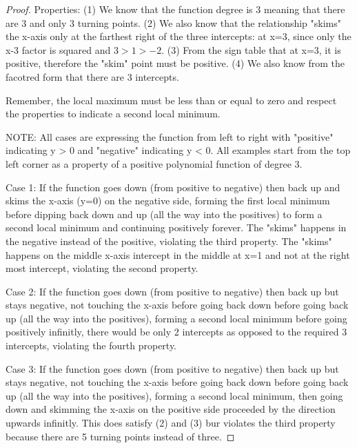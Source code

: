 \documentclass[12pt]{book}
\begin{document}
\begin{enumerate}
\begin{proof}
\vspace{0.5cm}
Properties: (1) We know that the function degree is 3 meaning that there are 3 and only 3 turning points. 
(2) We also know that the relationship "skims" the x-axis only at the farthest right of the three intercepts:
at x=3, since only the x-3 factor is squared and $3>1>-2$. (3) From the sign table that at x=3, it is positive, 
therefore the "skim" point must be positive. (4) We also know from the facotred form that there are 3 intercepts.

\vspace{0.5cm}
Remember, the local maximum must be less than or equal to zero and respect the properties
to indicate a second local minimum.

\vspace{0.5cm}
NOTE: All cases are expressing the function from left to right with "positive" indicating y > 0 and "negative" indicating y < 0. 
All examples start from the top left corner as a property of a positive polynomial function of degree 3.

\newpage

Case 1: If the function goes down (from positive to negative) then back up and skims the x-axis (y=0) on 
the negative side, forming the first local minimum before dipping back down and up (all the way into the positives) 
to form a second local minimum and continuing positively forever. The "skims" happens in the negative instead of the positive, violating the third property.
The "skims" happens on the middle x-axis intercept in the middle at x=1 and not at the right most intercept, violating the second property.
\vspace{0.5cm}

Case 2: If the function goes down (from positive to negative) then back up but stays negative, not touching the x-axis before going 
back down before going back up (all the way into the positives), forming a second local minimum before going positively infinitly, there would be only 2 intercepts 
as opposed to the required 3 intercepts, violating the fourth property.
\vspace{0.5cm}

Case 3: If the function goes down (from positive to negative) then back up but stays negative, not touching the x-axis before going 
back down before going back up (all the way into the positives), forming a second local minimum, then going down and skimming the 
x-axis on the positive side proceeded by the direction upwards infinitly. This does satisfy (2) and (3) bur violates the third property 
because there are 5 turning points instead of three.
\vspace{0.5cm}


\end{proof}
\end{enumerate}
\end{document}
